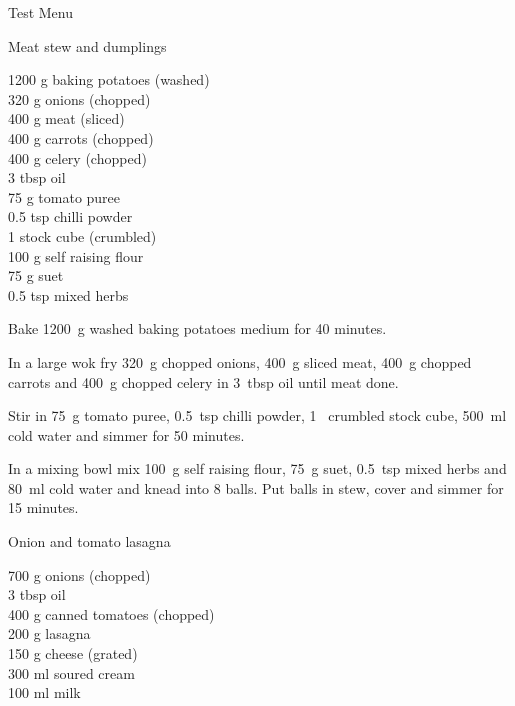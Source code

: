 \begin{menu}{Test Menu}
    \begin{recipe}{2}{Meat stew and dumplings}%
    
		\begin{ingredients}
		1200 g baking potatoes (washed) \\
	320 g onions (chopped) \\
	400 g meat (sliced) \\
	400 g carrots (chopped) \\
	400 g celery (chopped) \\
	3 tbsp oil  \\
	75 g tomato puree  \\
	0.5 tsp chilli powder  \\
	1  stock cube (crumbled) \\
	100 g self raising flour  \\
	75 g suet  \\
	0.5 tsp mixed herbs  \\
	
		\end{ingredients}
	
	
	
    \begin{instructions}
    \item 
      Bake 1200~g washed baking potatoes
      medium for 40 minutes.
    \item 
        In a large wok fry
        320~g chopped onions,
        400~g sliced meat,
        400~g chopped carrots
        and
        400~g chopped celery
        in
        3~tbsp  oil
        until meat done.
      \item 
        Stir in
        75~g  tomato puree,
        0.5~tsp  chilli powder,
        1~ crumbled stock cube,
        500~ml  cold water
        and simmer for 50 minutes.
      \item 
        In a mixing bowl mix
        100~g  self raising flour,
        75~g  suet,
        0.5~tsp  mixed herbs
        and
        80~ml  cold water
        and knead into 8 balls.
        Put balls in stew, cover and
        simmer for 15 minutes.
      
    \end{instructions}
    \end{recipe}%
  
    \begin{recipe}{2}{Onion and tomato lasagna}%
    
		\begin{ingredients}
		700 g onions (chopped) \\
	3 tbsp oil  \\
	400 g canned tomatoes (chopped) \\
	200 g lasagna  \\
	150 g cheese (grated) \\
	300 ml soured cream  \\
	100 ml milk  \\
	

\end{ingredients}
\end{recipe}
\end{menu}
